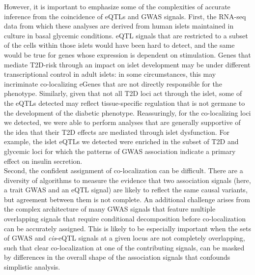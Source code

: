 However, it is important to emphasize some of the complexities of accurate inference from the coincidence of eQTLs and GWAS signals. First, the RNA-seq data from which these analyses are derived from human islets maintained in culture in basal glycemic conditions. eQTL signals that are restricted to a subset of the cells within those islets would have been hard to detect, and the same would be true for genes whose expression is dependent on stimulation. Genes that mediate T2D-risk through an impact on islet development may be under different transcriptional control in adult islets: in some circumstances, this may incriminate co-localizing eGenes that are not directly responsible for the phenotype. Similarly, given that not all T2D loci act through the islet, some of the eQTLs detected may reflect tissue-specific regulation that is not germane to the development of the diabetic phenotype. Reassuringly, for the co-localizing loci we detected, we were able to perform analyses that are generally supportive of the idea that their T2D effects are mediated through islet dysfunction. For example, the islet eQTLs we detected were enriched in the subset of T2D and glycemic loci for which the patterns of GWAS association indicate a primary effect on insulin secretion.\\

Second, the confident assignment of co-localization can be difficult. There are a diversity of algorithms to measure the evidence that two association signals (here, a trait GWAS and an eQTL signal) are likely to reflect the same causal variants, but agreement between them is not complete. An additional challenge arises from the complex architecture of many GWAS signals that feature multiple overlapping signals that require conditional decomposition before co-localization can be accurately assigned. This is likely to be especially important when the sets of GWAS and \textit{cis}-eQTL signals at a given locus are not completely overlapping, such that clear co-localization at one of the contributing signals, can be masked by differences in the overall shape of the association signals that confounds simplistic analysis. \\

